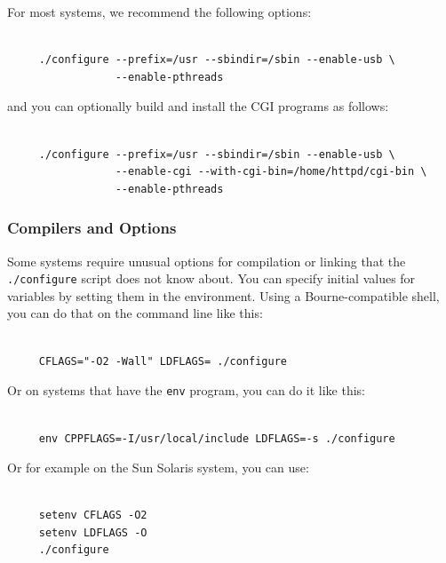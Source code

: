 For most systems, we recommend the following options: 

\footnotesize
\begin{verbatim}
     
     ./configure --prefix=/usr --sbindir=/sbin --enable-usb \
                 --enable-pthreads
\end{verbatim}
\normalsize

and you can optionally build and install the CGI programs as follows: 

\footnotesize
\begin{verbatim}
     
     ./configure --prefix=/usr --sbindir=/sbin --enable-usb \
                 --enable-cgi --with-cgi-bin=/home/httpd/cgi-bin \
                 --enable-pthreads
\end{verbatim}
\normalsize

\label{Compilers-and-Options}

\subsubsection*{Compilers and Options}
\index{Options!Compilers and }

\label{index-compiler-options-30}
Some systems require unusual options for compilation or linking that the {\tt
./configure} script does not know about. You can specify initial values for
variables by setting them in the environment. Using a Bourne-compatible shell,
you can do that on the command line like this: 

\footnotesize
\begin{verbatim}
     
     CFLAGS="-O2 -Wall" LDFLAGS= ./configure
\end{verbatim}
\normalsize

Or on systems that have the {\tt env} program, you can do it like this: 

\footnotesize
\begin{verbatim}
     
     env CPPFLAGS=-I/usr/local/include LDFLAGS=-s ./configure
\end{verbatim}
\normalsize

Or for example on the Sun Solaris system, you can use: 

\footnotesize
\begin{verbatim}
     
     setenv CFLAGS -O2
     setenv LDFLAGS -O
     ./configure
\end{verbatim}
\normalsize

